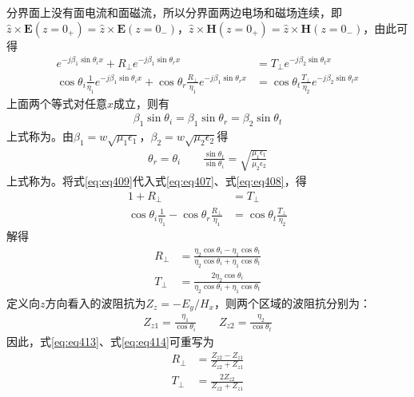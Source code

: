 \documentclass{article}
\numberwithin{equation}{section}
\begin{document}
分界面上没有面电流和面磁流，所以分界面两边电场和磁场连续，即$\hat{z}\times\mathbf{E}(z=0_+)=\hat{z}\times\mathbf{E}(z=0_-)$，$\hat{z}\times\mathbf{H}(z=0_+)=\hat{z}\times\mathbf{H}(z=0_-)$，由此可得
\begin{align}
    \label{eq:eq407}
    e^{-j\beta_1\sin\theta_ix}+R_{\perp}e^{-j\beta_1\sin\theta_rx}&=T_{\perp}e^{-j\beta_2\sin\theta_tx} \\
    \label{eq:eq408}
    \cos\theta_i\frac{1}{\eta_1}e^{-j\beta_1\sin\theta_ix}+\cos\theta_r\frac{R_{\perp}}{\eta_1}e^{-j\beta_1\sin\theta_rx}&=\cos\theta_t\frac{T_{\perp}}{\eta_2}e^{-j\beta_2\sin\theta_tx}
\end{align}
上面两个等式对任意$x$成立，则有
\begin{align}
    \label{eq:eq409}
    \beta_1\sin\theta_i=\beta_1\sin\theta_r=\beta_2\sin\theta_t
\end{align}
上式称为\textbf{\color{blue}{相位匹配条件}}。由$\beta_1=w\sqrt{\mu_1\epsilon_1}$，$\beta_2=w\sqrt{\mu_2\epsilon_2}$得
\begin{align}
    \label{eq:eq410}
    \theta_r=\theta_i\qquad\frac{\sin\theta_t}{\sin\theta_i}=\sqrt{\frac{\mu_1\epsilon_1}{\mu_2\epsilon_2}}
\end{align}
上式称为\textbf{\color{blue}{斯奈尔反射和折射定律}}。将式\ref{eq:eq409}代入式\ref{eq:eq407}、式\ref{eq:eq408}，得
\begin{align}
    \label{eq:eq411}
    1+R_{\perp}&=T_{\perp} \\
    \label{eq:eq412}
    \cos\theta_i\frac{1}{\eta_1}-\cos\theta_r\frac{R_{\perp}}{\eta_1}&=\cos\theta_t\frac{T_{\perp}}{\eta_2}
\end{align}
解得
\begin{align}
    \label{eq:eq413}
    R_{\perp}&=\frac{\eta_2\cos\theta_i-\eta_1\cos\theta_t}{\eta_2\cos\theta_i+\eta_1\cos\theta_t} \\
    \label{eq:eq414}
    T_{\perp}&=\frac{2\eta_2\cos\theta_i}{\eta_2\cos\theta_i+\eta_1\cos\theta_t}
\end{align}
定义向$z$方向看入的波阻抗为$Z_z=-E_y/H_x$，则两个区域的波阻抗分别为：
\begin{align}
    \label{eq:eq415}
    Z_{z1}=\frac{\eta_1}{\cos\theta_i}\qquad Z_{z2}=\frac{\eta_2}{\cos\theta_t}
\end{align}
因此，式\ref{eq:eq413}、式\ref{eq:eq414}可重写为
\begin{align}
    \label{eq:eq416}
    R_{\perp}&=\frac{Z_{z2}-Z_{z1}}{Z_{z2}+Z_{z1}} \\
    \label{eq:eq417}
    T_{\perp}&=\frac{2Z_{z2}}{Z_{z2}+Z_{z1}}
\end{align}
\end{document}
